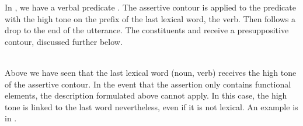 In , we have a verbal predicate . The assertive contour is applied to the predicate with the high tone on the prefix of the last lexical word, the  verb. Then follows a drop to the end of the utterance. The constituents  and  receive a presuppositive contour, discussed further below.

 \\

Above we have seen that the last lexical word (noun, verb) receives the high tone of the assertive contour.
In the event that the assertion only contains functional elements, the description formulated above cannot apply. In this case,  the high tone is linked to the last word nevertheless, even if it is not lexical. An example is  in .

 \\




